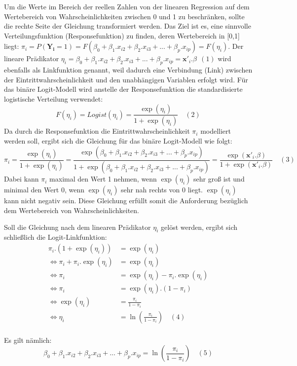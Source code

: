 \documentclass[12pt,]{article}
\begin{document}
Um die Werte im Bereich der reellen Zahlen von der linearen Regression
auf dem Wertebereich von Wahrscheinlichkeiten zwischen 0 und 1 zu
beschränken, sollte die rechte Seite der Gleichung transformiert werden.
Das Ziel ist es, eine sinnvolle Verteilungsfunktion (Responsefunktion)
zu finden, deren Wertebereich in {[}0,1{]} liegt:
\(\pi_i = P(\mathbf{Y_i} = 1) = F(\beta_0 + \beta_1.x_{i2} + \beta_2.x_{i3} + ... + \beta_p.x_{ip}) = F(\eta_i)\).
Der lineare Prädikator
\(\eta_i = \beta_0 + \beta_1.x_{i2} + \beta_2.x_{i3} + ... + \beta_p.x_{ip} = \mathbf{x'}_i.\beta \ \ (1)\)
wird ebenfalls als Linkfunktion genannt, weil dadurch eine Verbindung
(Link) zwischen der Eintrittwahrscheinlichkeit und den unabhängigen
Variablen erfolgt wird. Für das binäre Logit-Modell wird anstelle der
Responsefunktion die standardisierte logistische Verteilung verwendet:
\[
F(\eta_i) = Logist(\eta_i) = \frac{\exp(\eta_i)}{1 + \exp(\eta_i)} \quad (2)
\] Da durch die Responsefunktion die Eintrittwahrscheinlichkeit
\(\pi_i\) modelliert werden soll, ergibt sich die Gleichung für das
binäre Logit-Modell wie folgt: \[
\pi_i = \frac{\exp(\eta_i)}{1 + \exp(\eta_i)} = \frac{\exp(\beta_0 + \beta_1.x_{i2} + \beta_2.x_{i3} + ... + \beta_p.x_{ip})}{1 + \exp(\beta_0 + \beta_1.x_{i2} + \beta_2.x_{i3} + ... + \beta_p.x_{ip})} = \frac{\exp(\mathbf{x'}_i.\beta)}{1+\exp(\mathbf{x'}_i.\beta)} \quad (3)
\] Dabei kann \(\pi_i\) maximal den Wert 1 nehmen, wenn \(\exp(\eta_i)\)
sehr groß ist und minimal den Wert 0, wenn \(\exp(\eta_i)\) sehr nah
rechts von 0 liegt. \(\exp(\eta_i)\) kann nicht negativ sein. Diese
Gleichung erfüllt somit die Anforderung bezüglich dem Wertebereich von
Wahrscheinlichkeiten.

Soll die Gleichung nach dem linearen Prädikator \(\eta_i\) gelöst
werden, ergibt sich schließlich die Logit-Linkfunktion: \[
\begin{aligned}
\pi_i.(1 + \exp(\eta_i)) &= \exp(\eta_i) \\
\Leftrightarrow \pi_i + \pi_i.\exp(\eta_i) &= \exp(\eta_i) \\
\Leftrightarrow \pi_i &= \exp(\eta_i) - \pi_i.\exp(\eta_i)  \\
\Leftrightarrow \pi_i &= \exp(\eta_i).(1-\pi_i) \\
\Leftrightarrow \exp(\eta_i) &= \frac{\pi_i}{1-\pi_i} \\
\Leftrightarrow \eta_i &= \ln(\frac{\pi_i}{1-\pi_i}) \quad (4)\\
\end{aligned} 
\]

Es gilt nämlich: \[
\beta_0 + \beta_1.x_{i2} + \beta_2.x_{i3} + ... + \beta_p.x_{ip} = \ln(\frac{\pi_i}{1-\pi_i}) \quad (5)
\]
\end{document}
